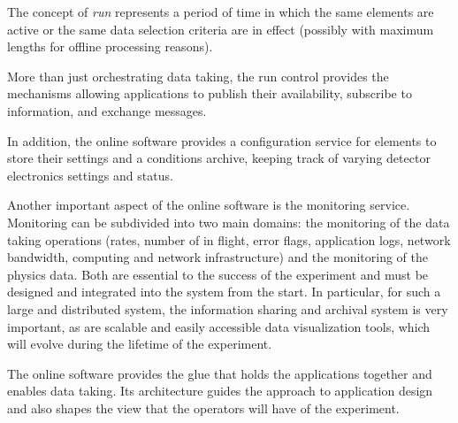 The concept of \textit{run} represents a period of time in which the same
 elements are active or the same data selection criteria
are in effect (possibly with maximum lengths for offline processing
reasons). 

More than just orchestrating data taking, the run control
provides the mechanisms allowing  applications to publish
their availability, subscribe to information, and exchange messages. 

In addition, the online software provides a configuration service
for  elements to store their settings and a conditions
archive, keeping track of varying detector electronics settings and
status.

Another important aspect of the online software is the monitoring
service.
Monitoring can be subdivided into two main domains: the monitoring of
the data taking operations (rates, number of 
in flight, error flags, application logs, network bandwidth, %
computing and network infrastructure) and the monitoring of the
physics data.
Both are essential to the success of the experiment and must be %
designed and integrated into the  system from the start.
In particular, for such a large and distributed system, the information sharing and archival system is very important, as are 
scalable and easily accessible data visualization tools, which will evolve during the lifetime of the experiment.

The online software provides the glue that holds the
 applications together and enables %
data taking.
Its architecture guides the
approach to  application design and also shapes the view
that the operators will have of the experiment.

